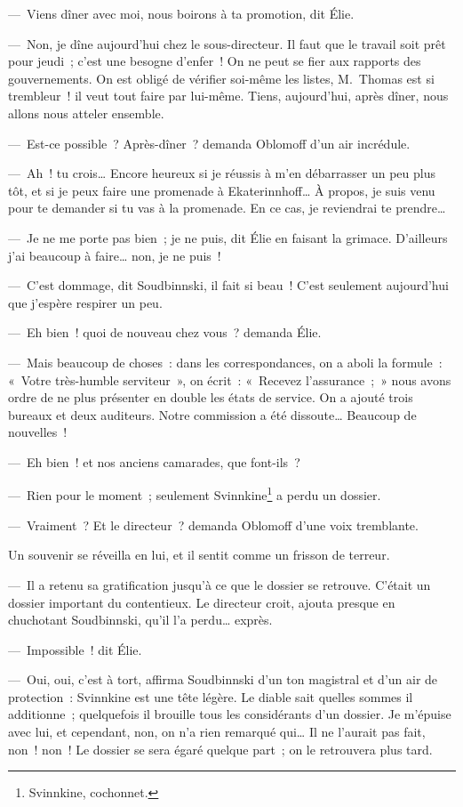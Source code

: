 \documentclass[french,twoside]{book} %
\begin{document}
— Viens dîner avec moi, nous boirons à ta promotion, dit Élie.\par
— Non, je dîne aujourd’hui chez le sous-directeur. Il faut que le travail soit prêt pour jeudi ; c’est une besogne d’enfer ! On ne peut se fier aux rapports des gouvernements. On est obligé de vérifier soi-même les listes, M. Thomas est si trembleur ! il veut tout faire par lui-même. Tiens, aujourd’hui, après dîner, nous allons nous atteler ensemble.\par
— Est-ce possible ? Après-dîner ? demanda Oblomoff d’un air incrédule.\par
— Ah ! tu crois… Encore heureux si je réussis à m’en débarrasser un peu plus tôt, et si je peux faire une promenade à Ekaterinnhoff… À propos, je suis venu pour te demander si tu vas à la promenade. En ce cas, je reviendrai te prendre…\par
— Je ne me porte pas bien ; je ne puis, dit Élie en faisant la grimace. D’ailleurs j’ai beaucoup à faire… non, je ne puis !\par
— C’est dommage, dit Soudbinnski, il fait si beau ! C’est seulement aujourd’hui que j’espère respirer un peu.\par
— Eh bien ! quoi de nouveau chez vous ? demanda Élie.\par
— Mais beaucoup de choses : dans les correspondances, on a aboli la formule : « Votre très-humble serviteur », on écrit : « Recevez l’assurance ; » nous avons ordre de ne plus présenter en double les états de service. On a ajouté trois bureaux et deux auditeurs. Notre commission a été dissoute… Beaucoup de nouvelles !\par
— Eh bien ! et nos anciens camarades, que font-ils ?\par
— Rien pour le moment ; seulement Svinnkine\footnote{Svinnkine, cochonnet.} a perdu un dossier.\par
— Vraiment ? Et le directeur ? demanda Oblomoff d’une voix tremblante.\par
Un souvenir se réveilla en lui, et il sentit comme un frisson de terreur.\par
— Il a retenu sa gratification jusqu’à ce que le dossier se retrouve. C’était un dossier important du contentieux. Le directeur croit, ajouta presque en chuchotant Soudbinnski, qu’il l’a perdu… exprès.\par
— Impossible ! dit Élie.\par
— Oui, oui, c’est à tort, affirma Soudbinnski d’un ton magistral et d’un air de protection : Svinnkine est une tête légère. Le diable sait quelles sommes il additionne ; quelquefois il brouille tous les considérants d’un dossier. Je m’épuise avec lui, et cependant, non, on n’a rien remarqué qui… Il ne l’aurait pas fait, non ! non ! Le dossier se sera égaré quelque part ; on le retrouvera plus tard.\par
\end{document}
